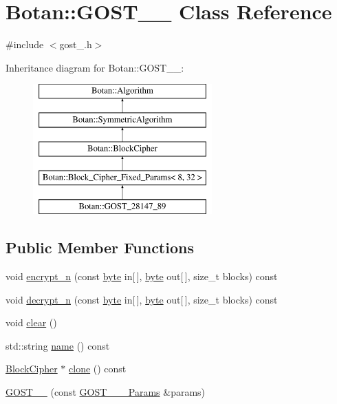 \hypertarget{classBotan_1_1GOST__28147__89}{\section{Botan\-:\-:G\-O\-S\-T\-\_\-\_ Class Reference}
\label{classBotan_1_1GOST__28147__89}
}


{\ttfamily \#include $<$gost\-\_.\-h$>$}

Inheritance diagram for Botan\-:\-:G\-O\-S\-T\-\_\-\_\-:\begin{figure}[H]
\begin{center}
\leavevmode
\includegraphics[height=5.000000cm]{classBotan_1_1GOST__28147__89}
\end{center}
\end{figure}
\subsection*{Public Member Functions}
\begin{DoxyCompactItemize}
\item 
void \hyperlink{classBotan_1_1GOST__28147__89_a64139f883a7d2b050ff6d7503f1312df}{encrypt\-\_\-n} (const \hyperlink{namespaceBotan_a7d793989d801281df48c6b19616b8b84}{byte} in\mbox{[}$\,$\mbox{]}, \hyperlink{namespaceBotan_a7d793989d801281df48c6b19616b8b84}{byte} out\mbox{[}$\,$\mbox{]}, size\-\_\-t blocks) const 
\item 
void \hyperlink{classBotan_1_1GOST__28147__89_a618c710b55011e0ef9c8c6c8447c4705}{decrypt\-\_\-n} (const \hyperlink{namespaceBotan_a7d793989d801281df48c6b19616b8b84}{byte} in\mbox{[}$\,$\mbox{]}, \hyperlink{namespaceBotan_a7d793989d801281df48c6b19616b8b84}{byte} out\mbox{[}$\,$\mbox{]}, size\-\_\-t blocks) const 
\item 
void \hyperlink{classBotan_1_1GOST__28147__89_aa006a753c666d49f2b37799c28fc863e}{clear} ()
\item 
std\-::string \hyperlink{classBotan_1_1GOST__28147__89_a681095d7de662ab48e796a96dfd5a9d0}{name} () const 
\item 
\hyperlink{classBotan_1_1BlockCipher}{Block\-Cipher} $\ast$ \hyperlink{classBotan_1_1GOST__28147__89_afea8d452bbb190b1094643f8a816343d}{clone} () const 
\item 
\hyperlink{classBotan_1_1GOST__28147__89_ab53cc8d7ba40b68b184afa9ad8bf0833}{G\-O\-S\-T\-\_\-\_} (const \hyperlink{classBotan_1_1GOST__28147__89__Params}{G\-O\-S\-T\-\_\-\_\-\_\-\-Params} \&params)
\end{DoxyCompactItemize}
